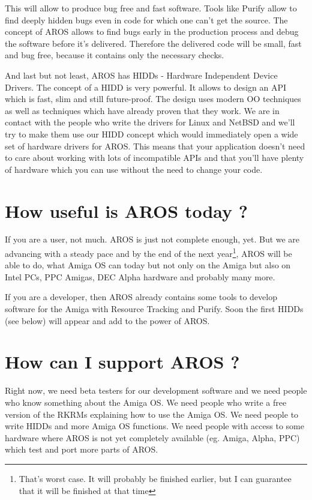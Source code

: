 This will allow to produce bug free and fast software. Tools like Purify
allow to find deeply hidden bugs even in code for which one can't get the
source. The concept of AROS allows to find bugs early in the production
process and debug the software before it's delivered. Therefore the
delivered code will be small, fast and bug free, because it contains only
the necessary checks.

And last but not least, AROS has HIDDs - Hardware Independent Device
Drivers. The concept of a HIDD is very powerful. It allows to design an API
which is fast, slim and still future-proof. The design uses modern OO
techniques as well as techniques which have already proven that they work.
We are in contact with the people who write the drivers for Linux and
NetBSD and we'll try to make them use our HIDD concept which would
immediately open a wide set of hardware drivers for AROS. This means that
your application doesn't need to care about working with lots of
incompatible APIs and that you'll have plenty of hardware which you can use
without the need to change your code.

\section{How useful is AROS today ?}

If you are a user, not much. AROS is just not complete enough, yet.
But we are advancing with a steady pace and by the end of the next
year\footnote{That's worst case. It will probably be finished earlier, but
I can guarantee that it will be finished at that time}, AROS will be able to
do, what Amiga OS can today but not only on the Amiga but also on Intel PCs,
PPC Amigas, DEC Alpha hardware and probably many more.

If you are a developer, then AROS already contains some tools to
develop software for the Amiga with Resource Tracking and Purify.
Soon the first HIDDs (see below) will appear and add to the power of AROS.

\section{How can I support AROS ?}

Right now, we need beta testers for our development software and we need
people who know something about the Amiga OS. We need people who write a
free version of the RKRMs explaining how to use the Amiga OS. We need people
to write HIDDs and more Amiga OS functions. We need people with access to
some hardware where AROS is not yet completely available (eg. Amiga, Alpha,
PPC) which test and port more parts of AROS.

